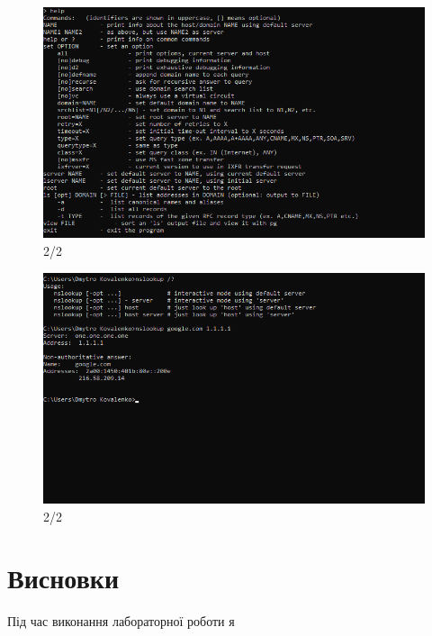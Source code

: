 \documentclass{article}
\begin{document}
\begin{normalsize}
\begin{figure}[H]
	\centering
	\includegraphics[width=\textwidth]{7}
	\caption{2/2}
\end{figure}
\begin{figure}[H]
	\centering
	\includegraphics[width=\textwidth]{8}
	\caption{2/2}
\end{figure}

\section*{Висновки}
Під час виконання лабораторної роботи я 
	    
\end{normalsize}
\end{document}
